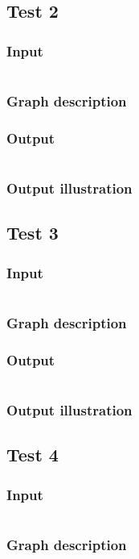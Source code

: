\documentclass{article}
\begin{document}
\subsection{Test 2}
\subsubsection*{Input}
\inputminted{sh}{./in2}
\subsubsection*{Graph description}

\subsubsection*{Output}
\inputminted{sh}{./out2}
\subsubsection*{Output illustration}


\newpage

\subsection{Test 3}
\subsubsection*{Input}
\inputminted{sh}{./in3}
\subsubsection*{Graph description}

\subsubsection*{Output}
\inputminted{sh}{./out3}
\subsubsection*{Output illustration}


\subsection{Test 4}
\subsubsection*{Input}
\inputminted{sh}{./in4}
\subsubsection*{Graph description}

\end{document}
